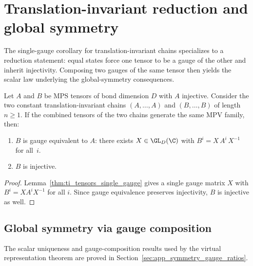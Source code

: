\section{Translation-invariant reduction and global symmetry}%
\label{sec:ti_reduction}

The single-gauge corollary for translation-invariant chains specializes to
a reduction statement: equal states force one tensor to be a gauge of the
other and inherit injectivity. Composing two gauges of the same tensor then
yields the scalar law underlying the global-symmetry consequences.

\begin{lemma}%
    \label{thm:ti_reduction_corollary}
    \leanok
    Let $A$ and $B$ be MPS tensors of bond dimension $D$ with $A$
    injective.
    Consider the two constant translation-invariant chains
    $(A, \ldots, A)$ and $(B, \ldots, B)$ of length $n \ge 1$.
    If the combined tensors of the two chains generate the same MPV
    family, then:
    \begin{enumerate}
        \item $B$ is gauge equivalent to $A$: there exists
              $X \in \GL_D(\C)$ with $B^i = X\, A^i\, X^{-1}$ for
              all~$i$.
        \item $B$ is injective.
    \end{enumerate}
\end{lemma}

\begin{proof}\leanok{}
    Lemma~\ref{thm:ti_tensors_single_gauge} gives a single gauge matrix
    $X$ with $B^i = X A^i X^{-1}$ for all $i$.
    Since gauge equivalence preserves injectivity, $B$ is injective as well.
\end{proof}

\subsection{Global symmetry via gauge composition}

The scalar uniqueness and gauge-composition results used by the virtual
representation theorem are proved in
Section~\ref{sec:app_symmetry_gauge_ratios}.
